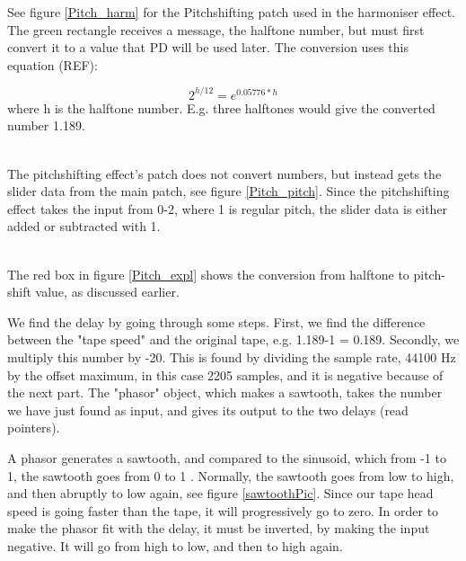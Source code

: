 See figure \ref{Pitch_harm} for the Pitchshifting patch used in the harmoniser effect. The green rectangle receives a message, the halftone number, but must first convert it to 
a value that PD will be used later. The conversion uses this equation (REF):

\[ 2^{h/12} = e^{0.05776*h} \] where h is the halftone number. E.g. three halftones would give the converted number 1.189. \\

\begin{minipage}{\linewidth}%
\label{Pitch_harm}
\end{minipage}\\

The pitchshifting effect's patch does not convert numbers, but instead gets the slider data from the main patch, see figure \ref{Pitch_pitch}. Since the pitchshifting effect takes 
the input from 0-2, where 1 is regular pitch, the slider data is either added or subtracted with 1. 

\begin{minipage}{\linewidth}%
\label{Pitch_pitch}
\end{minipage}\\

The red box in figure \ref{Pitch_expl} shows the conversion from halftone to pitch-shift value, as discussed earlier. 

We find the delay by going through some steps. First, we find the difference between the "tape speed" and the original tape, e.g. 1.189-1 = 0.189. 
Secondly, we multiply this number by -20. This is found by dividing the sample rate, 44100 Hz by the offset maximum, in this case 2205 samples,
and it is negative because of the next part. The "phasor" object, which makes a sawtooth, takes the number we have just found as input, and gives its output to the two delays (read pointers). 

A phasor generates a sawtooth, and compared to the sinusoid, which from -1 to 1, the sawtooth goes from 0 to 1 \citep{FlossManuals}. Normally, the sawtooth goes from low to high, and then abruptly to low again, see figure \ref{sawtoothPic}. Since our tape head speed is going faster than the tape, it will progressively go to zero. In order to make the phasor fit with the delay, it must be inverted, by making the input negative. It will go from high to low, and then to high again.   


